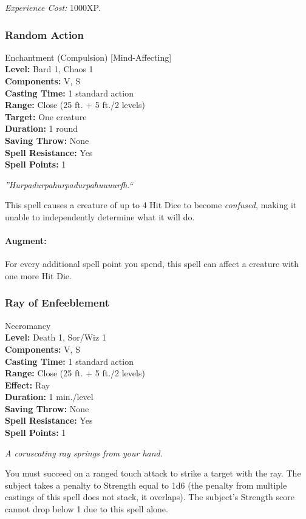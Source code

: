 \emph{Experience Cost:} 1000XP.
\subsubsection{Random Action}
\label{Spell:RandomAction}
Enchantment (Compulsion) [Mind-Affecting]
\\ \textbf{Level:} Bard 1, Chaos 1
\\ \textbf{Components:} V, S
\\ \textbf{Casting Time:} 1 standard action
\\ \textbf{Range:} Close (25 ft. + 5 ft./2 levels)
\\ \textbf{Target:} One creature
\\ \textbf{Duration:} 1 round
\\ \textbf{Saving Throw:} None
\\ \textbf{Spell Resistance:} Yes
\\ \textbf{Spell Points:} 1

\emph{''Hurpadurpahurpadurpahuuuurfh.``}

This spell causes a creature of up to 4 Hit Dice to become \emph{confused}, making it unable to independently determine what it will do.

\paragraph{Augment:} For every additional spell point you spend, this spell can affect a creature with one more Hit Die.
\subsubsection{Ray of Enfeeblement}
\label{Spell:RayOfEnfeeblement}
Necromancy
\\ \textbf{Level:} Death 1, Sor/Wiz 1
\\ \textbf{Components:} V, S
\\ \textbf{Casting Time:} 1 standard action
\\ \textbf{Range:} Close (25 ft. + 5 ft./2 levels)
\\ \textbf{Effect:} Ray
\\ \textbf{Duration:} 1 min./level
\\ \textbf{Saving Throw:} None
\\ \textbf{Spell Resistance:} Yes
\\ \textbf{Spell Points:} 1

\emph{A coruscating ray springs from your hand.} 

You must succeed on a ranged touch attack to strike a target with the ray. 
The subject takes a penalty to Strength equal to 1d6 (the penalty from multiple castings of this spell does not stack, it overlaps).
The subject's Strength score cannot drop below 1 due to this spell alone.

